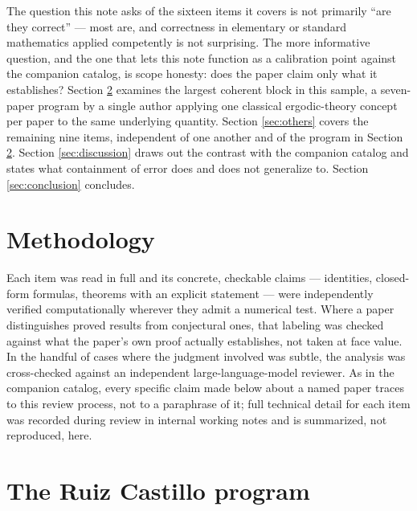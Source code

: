 \documentclass[11pt]{article}
\begin{document}
The question this note asks of the sixteen items it covers is not
primarily ``are they correct'' --- most are, and correctness in
elementary or standard mathematics applied competently is not
surprising. The more informative question, and the one that lets this
note function as a calibration point against the companion catalog, is
scope honesty: does the paper claim only what it establishes? Section
\ref{sec:rc} examines the largest coherent block in this sample, a
seven-paper program by a single author applying one classical
ergodic-theory concept per paper to the same underlying quantity.
Section \ref{sec:others} covers the remaining nine items, independent
of one another and of the program in Section \ref{sec:rc}. Section
\ref{sec:discussion} draws out the contrast with the companion catalog
and states what containment of error does and does not generalize to.
Section \ref{sec:conclusion} concludes.

\section{Methodology}
\label{sec:methodology}

Each item was read in full and its concrete, checkable claims ---
identities, closed-form formulas, theorems with an explicit statement
--- were independently verified computationally wherever they admit a
numerical test. Where a paper distinguishes proved results from
conjectural ones, that labeling was checked against what the paper's
own proof actually establishes, not taken at face value. In the
handful of cases where the judgment involved was subtle, the analysis
was cross-checked against an independent large-language-model reviewer.
As in the companion catalog, every specific claim made below about a
named paper traces to this review process, not to a paraphrase of it;
full technical detail for each item was recorded during review in
internal working notes and is summarized, not reproduced, here.

\section{The Ruiz Castillo program}
\label{sec:rc}
\end{document}

